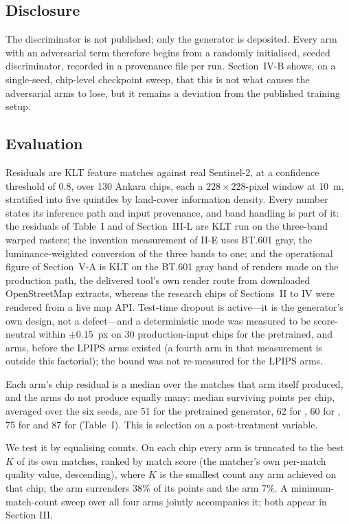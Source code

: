 \subsection{Disclosure}

The discriminator is not published; only the generator is deposited. Every arm with an
adversarial term therefore begins from a randomly initialised, seeded discriminator,
recorded in a provenance file per run. Section~IV-B shows, on a single-seed, chip-level checkpoint sweep, that this is not
what causes the adversarial arms to lose, but it remains a deviation from the published training setup.

\subsection{Evaluation}

Residuals are KLT feature matches \cite{saunier2024karios} against real Sentinel-2, at a confidence threshold of
0.8, over 130 Ankara chips, each a $228\times228$-pixel window at 10~m, stratified into five
quintiles by land-cover information density. Every number states its inference path and input provenance, and band handling is part
of it: the residuals of Table~I and of Section~III-L are KLT run on the three-band warped
rasters; the invention measurement of II-E uses BT.601 gray, the luminance-weighted
conversion of the three bands to one; and the operational figure of Section~V-A is KLT on
the BT.601 gray band of renders made on the production path, the delivered tool's own
render route from downloaded OpenStreetMap extracts, whereas the research chips of
Sections~II to IV were rendered from a live map API. Test-time dropout is active---it is
the generator's own design, not a defect---and a deterministic mode was measured to be
score-neutral within $\pm0.15$~px on 30 production-input chips for the pretrained,
\advLone{} and \Lone{} arms, before the LPIPS arms existed (a fourth arm in that
measurement is outside this factorial); the bound was not re-measured for the LPIPS arms.

Each arm's chip residual is a median over the matches that arm itself produced,
and the arms do not produce equally many: median surviving points per chip, averaged over the six seeds, are 51 for the
pretrained generator, 62 for \advLone{}, 60 for \advLPIPS{}, 75 for \Lone{}
and 87 for \LPIPSonly{} (Table~I). This is selection on a post-treatment variable.

We test it by equalising counts. On each chip every arm is truncated to the best $K$ of its own matches, ranked by match score (the matcher's own
per-match quality value, descending), where $K$ is the smallest count any arm achieved on
that chip; the \LPIPSonly{} arm surrenders 38\% of its points and the \advLPIPS{}
arm 7\%. A minimum-match-count sweep over all four arms jointly accompanies it; both appear in
Section III.

